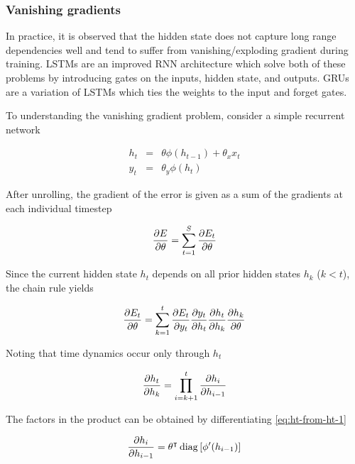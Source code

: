 \subsubsection{Vanishing gradients}

In practice, it is observed that the hidden state does not capture long range
dependencies well and tend to suffer from vanishing/exploding gradient during
training. LSTMs are an improved RNN architecture which solve both of these
problems by introducing gates on the inputs, hidden state, and outputs. GRUs are
a variation of LSTMs which ties the weights to the input and forget gates.

To understanding the vanishing gradient problem, consider a simple recurrent network

\begin{eqnarray}
    h_t &=& \theta \phi(h_{t-1}) + \theta_x x_t \label{eq:ht-from-ht-1}\\
    y_t &=& \theta_y \phi(h_t)
\end{eqnarray}

After unrolling, the gradient of the error is given as a sum of the gradients
at each individual timestep

\begin{equation}
    \frac{\partial E}{\partial \theta} = \sum_{t=1}^S \frac{\partial E_t}{\partial \theta}
\end{equation}

Since the current hidden state $h_t$ depends on all prior hidden states $h_k$ ($k < t$),
the chain rule yields

\begin{equation}
    \frac{\partial E_t}{\partial \theta} = \sum_{k=1}^t \frac{\partial E_t}{\partial y_t} \frac{\partial y_t}{\partial h_t} \frac{\partial h_t}{\partial h_k} \frac{\partial h_k}{\partial \theta}
\end{equation}

Noting that time dynamics occur only through $h_t$

\begin{equation}
    \label{eq:prod-hi}
    \frac{\partial h_t}{\partial h_k} = \prod_{i=k+1}^t \frac{\partial h_i}{\partial h_{i-1}}
\end{equation}

The factors in the product can be obtained by differentiating \autoref{eq:ht-from-ht-1}

\begin{equation}
    \frac{\partial h_i}{\partial h_{i-1}} = \theta^\intercal \operatorname*{diag}\left[ \phi'(h_{i-1}) \right]
\end{equation}

